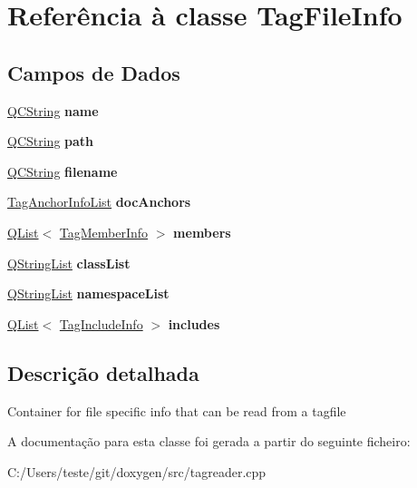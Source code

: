 \hypertarget{class_tag_file_info}{\section{Referência à classe Tag\-File\-Info}
\label{class_tag_file_info}
}
\subsection*{Campos de Dados}
\begin{DoxyCompactItemize}
\item 
\hypertarget{class_tag_file_info_adc0097c7bd1e61ad32058fcde425bc7a}{\hyperlink{class_q_c_string}{Q\-C\-String} {\bfseries name}}\label{class_tag_file_info_adc0097c7bd1e61ad32058fcde425bc7a}

\item 
\hypertarget{class_tag_file_info_a71216f035ef8cbf975e0712d46e89e9b}{\hyperlink{class_q_c_string}{Q\-C\-String} {\bfseries path}}\label{class_tag_file_info_a71216f035ef8cbf975e0712d46e89e9b}

\item 
\hypertarget{class_tag_file_info_a99a47216e8094a3186f3d837ee0b1c25}{\hyperlink{class_q_c_string}{Q\-C\-String} {\bfseries filename}}\label{class_tag_file_info_a99a47216e8094a3186f3d837ee0b1c25}

\item 
\hypertarget{class_tag_file_info_a3a6c53fe1869a01e3748ec5898a54458}{\hyperlink{class_tag_anchor_info_list}{Tag\-Anchor\-Info\-List} {\bfseries doc\-Anchors}}\label{class_tag_file_info_a3a6c53fe1869a01e3748ec5898a54458}

\item 
\hypertarget{class_tag_file_info_acab433535ad1575dfbddf6796d2baf98}{\hyperlink{class_q_list}{Q\-List}$<$ \hyperlink{class_tag_member_info}{Tag\-Member\-Info} $>$ {\bfseries members}}\label{class_tag_file_info_acab433535ad1575dfbddf6796d2baf98}

\item 
\hypertarget{class_tag_file_info_af3bb2d0ed4b98f17279d80fdf29f77cb}{\hyperlink{class_q_string_list}{Q\-String\-List} {\bfseries class\-List}}\label{class_tag_file_info_af3bb2d0ed4b98f17279d80fdf29f77cb}

\item 
\hypertarget{class_tag_file_info_ab4d7297c6d12af6e9780ef8994e6c439}{\hyperlink{class_q_string_list}{Q\-String\-List} {\bfseries namespace\-List}}\label{class_tag_file_info_ab4d7297c6d12af6e9780ef8994e6c439}

\item 
\hypertarget{class_tag_file_info_aeeb671d4f14985145c8d3873b6e704ce}{\hyperlink{class_q_list}{Q\-List}$<$ \hyperlink{class_tag_include_info}{Tag\-Include\-Info} $>$ {\bfseries includes}}\label{class_tag_file_info_aeeb671d4f14985145c8d3873b6e704ce}

\end{DoxyCompactItemize}


\subsection{Descrição detalhada}
Container for file specific info that can be read from a tagfile 

A documentação para esta classe foi gerada a partir do seguinte ficheiro\-:\begin{DoxyCompactItemize}
\item 
C\-:/\-Users/teste/git/doxygen/src/tagreader.\-cpp\end{DoxyCompactItemize}
